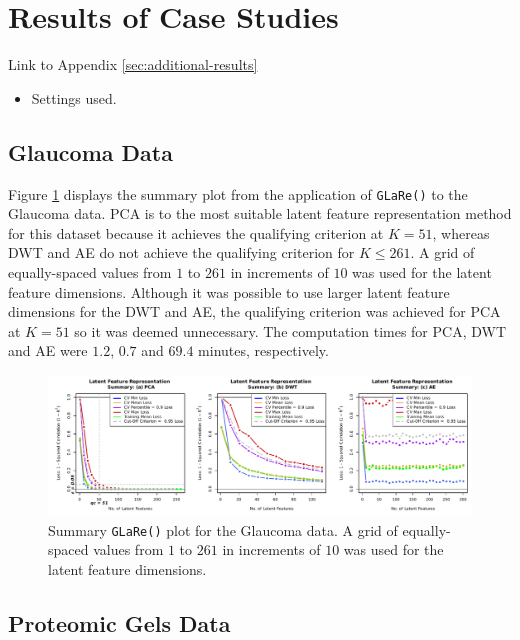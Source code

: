 \section{Results of Case Studies}\label{sec:results}

Link to Appendix \ref{sec:additional-results}
\begin{itemize}
    \item Settings used.
\end{itemize}

\subsection{Glaucoma Data}

Figure \ref{fig:eye-results} displays the summary plot from the application of \texttt{GLaRe()} to the Glaucoma data.
PCA is to the most suitable latent feature representation method for this dataset because it achieves the qualifying criterion at $K=51$, whereas DWT and AE do not achieve the qualifying criterion for $K \leq 261$.
A grid of equally-spaced values from $1$ to $261$ in increments of $10$ was used for the latent feature dimensions. 
Although it was possible to use larger latent feature dimensions for the DWT and AE, the qualifying criterion was achieved for PCA at $K=51$ so it was deemed unnecessary.
The computation times for PCA, DWT and AE were $1.2$, $0.7$ and $69.4$ minutes, respectively.


\begin{figure}
    \centering
    \includegraphics[width=1\textwidth]{figures/eye-results.pdf}
    \caption{Summary \texttt{GLaRe()} plot for the Glaucoma data. A grid of equally-spaced values from $1$ to $261$ in increments of $10$ was used for the latent feature dimensions.}
    \label{fig:eye-results}
\end{figure}

\subsection{Proteomic Gels Data}

